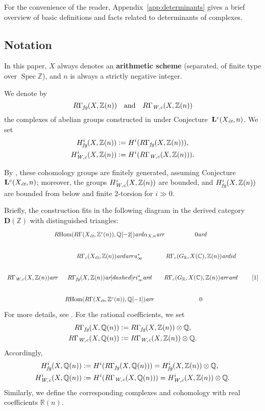 \documentclass[10pt,a4paper,oneside,draft]{article}
\DeclareMathOperator{\Hom}{Hom}
\DeclareMathOperator{\Spec}{Spec}
\newcommand{\CC}{\mathbb{C}}
\newcommand{\QQ}{\mathbb{Q}}
\newcommand{\RR}{\mathbb{R}}
\newcommand{\ZZ}{\mathbb{Z}}
\newcommand{\ar}{\text{\it ar}}
\newcommand{\et}{\text{\it \'{e}t}}
\newcommand{\fg}{\text{\it fg}}
\newcommand{\Wc}{\text{\it W,c}}
\newcommand{\dfn}{\mathrel{\mathop:}=}
\newcommand{\RHom}{R\!\Hom}
\theoremstyle{myplain}
\theoremstyle{mydefinition}
\numberwithin{equation}{section}
\begin{document}
For the convenience of the reader, Appendix~\ref{app:determinants} gives a brief
overview of basic definitions and facts related to determinants of complexes.

\subsection*{Notation}

In this paper, $X$ always denotes an \textbf{arithmetic scheme} (separated, of
finite type over $\Spec \ZZ$), and $n$ is always a strictly negative integer.

We denote by
\[
  R\Gamma_\fg (X, \ZZ (n))
  \quad\text{and}\quad
  R\Gamma_\Wc (X, \ZZ (n))
\]
the complexes of abelian groups constructed in \cite{Beshenov-Weil-etale-1}
under Conjecture~$\mathbf{L}^c (X_\et,n)$. We set
\begin{align*}
  H^i_\fg (X, \ZZ (n)) & \dfn H^i (R\Gamma_\fg (X, \ZZ (n))), \\
  H^i_\Wc (X, \ZZ (n)) & \dfn H^i (R\Gamma_\Wc (X, \ZZ (n))).
\end{align*}

By \cite[Proposition 5.5, Proposition 7.12]{Beshenov-Weil-etale-1}, these
cohomology groups are finitely generated, assuming
Conjecture~$\mathbf{L}^c (X_\et,n)$; moreover, the groups $H^i_\Wc (X, \ZZ(n))$
are bounded, and $H^i_\fg (X, \ZZ (n))$ are bounded from below and finite
$2$-torsion for $i \gg 0$.

Briefly, the construction fits in the following diagram in the derived category
$\mathbf{D} (\ZZ)$ with distinguished triangles:
\[ \begin{tikzcd}[column sep=1.5em]
    &[-3em] \RHom (R\Gamma (X_\et, \ZZ^c (n)), \QQ [-2]) \ar{d}{\alpha_{X,n}} \ar{r} &[-2.5em] 0 \ar{d} \\
    & R\Gamma_c (X_\et, \ZZ(n)) \ar{d}\ar{r}{u_\infty^*} & R\Gamma_c (G_\RR, X (\CC), \ZZ(n))\ar{d}{id} \\
    R\Gamma_\Wc (X, \ZZ (n)) \ar{r} & R\Gamma_\fg (X, \ZZ(n)) \ar[dashed]{r}{i_\infty^*}\ar{d} & R\Gamma_c (G_\RR, X (\CC), \ZZ(n)) \ar{r} \ar{d} & {[1]} \\
    & \RHom (R\Gamma (X_\et, \ZZ^c (n)), \QQ [-1]) \ar{r} & 0
\end{tikzcd} \]
For more details, see \cite{Beshenov-Weil-etale-1}. For the rational
coefficients, we set
\begin{align*}
  R\Gamma_\fg (X, \QQ (n)) & \dfn R\Gamma_\fg (X, \ZZ (n)) \otimes \QQ, \\
  R\Gamma_\Wc (X, \QQ (n)) & \dfn R\Gamma_\Wc (X, \ZZ (n)) \otimes \QQ.
\end{align*}
Accordingly,
\begin{align*}
  H^i_\fg (X, \QQ (n)) & \dfn H^i (R\Gamma_\fg (X, \QQ (n))) = H^i_\fg (X, \ZZ (n)) \otimes \QQ, \\
  H^i_\Wc (X, \QQ (n)) & \dfn H^i (R\Gamma_\Wc (X, \QQ (n))) = H^i_\Wc (X, \ZZ (n)) \otimes \QQ.
\end{align*}
Similarly, we define the corresponding complexes and cohomology with
real coefficients $\RR (n)$.
\end{document}
